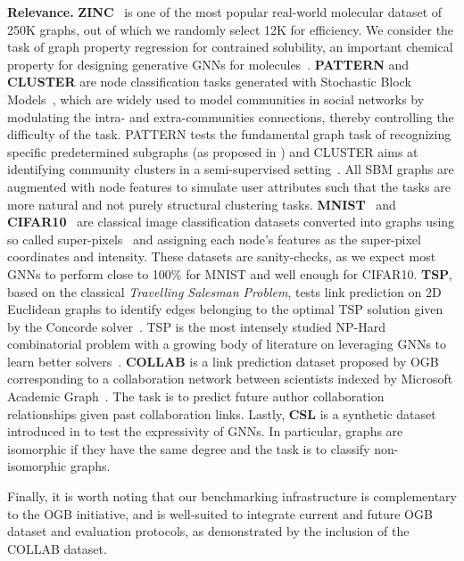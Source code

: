 \documentclass{article}
\begin{document}
{\bf Relevance. } 
\textbf{ZINC}~\cite{irwin2012zinc} is one of the most popular real-world molecular dataset of 250K graphs, out of which we randomly select 12K for efficiency.
We consider the task of graph property regression for contrained solubility, an important chemical property for designing generative GNNs for molecules~\cite{jin2018junction,you2018graph}. 
\textbf{PATTERN} and \textbf{CLUSTER} are node classification tasks generated with Stochastic Block Models~\cite{abbe2017community}, which are widely used to model communities in social networks by modulating the intra- and extra-communities connections, thereby controlling the difficulty of the task. 
PATTERN tests the fundamental graph task of recognizing specific predetermined subgraphs (as proposed in  \cite{art:ScarselliGoriTsoiHagenbuchnerMonfardini09}) and CLUSTER aims at identifying community clusters in a semi-supervised setting~\cite{kipf2017semi}. 
All SBM graphs are augmented with node features to simulate user attributes such that the tasks are more natural and not purely structural clustering tasks. 
\textbf{MNIST}~\cite{lecun1998gradient} and \textbf{CIFAR10}~\cite{krizhevsky2009learning} are classical image classification datasets converted into graphs using so called super-pixels~\cite{achanta2012slic} and assigning each node's features as the super-pixel coordinates and intensity. 
These datasets are sanity-checks, as we expect most GNNs to perform close to 100\% for MNIST and well enough for CIFAR10. 
\textbf{TSP}, based on the classical \textit{Travelling Salesman Problem}, tests link prediction on 2D Euclidean graphs to identify edges belonging to the optimal TSP solution given by the Concorde solver~\cite{applegate2006concorde}.  
TSP is the most intensely studied NP-Hard combinatorial problem with a growing body of literature on leveraging GNNs to learn better solvers~\cite{khalil2017learning,joshi2019efficient,bengio2018machine}. 
\textbf{COLLAB} is a link prediction dataset proposed by OGB~\cite{hu2020ogb} corresponding to a collaboration network between scientists indexed by Microsoft Academic Graph~\cite{wang2020microsoft}. 
The task is to predict future author collaboration relationships given past collaboration links. Lastly, \textbf{CSL} is a synthetic dataset introduced in \cite{murphy2019relational} to test the expressivity of GNNs. In particular, graphs are isomorphic if they have the same degree and the task is to classify non-isomorphic graphs. 

Finally, it is worth noting that our benchmarking infrastructure is complementary to the OGB initiative, and is well-suited to integrate current and future OGB dataset and evaluation protocols, as demonstrated by the inclusion of the COLLAB dataset.
\end{document}
